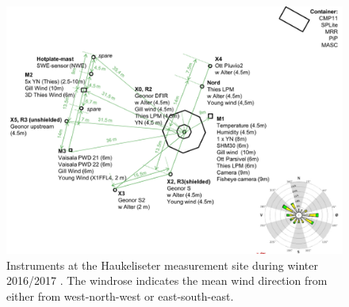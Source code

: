 \begin{figure}
\centering
	\includegraphics[width=\textwidth]{./fig_instruments/instrument_setting.png}
	\caption{Instruments at the Haukeliseter measurement site during winter 2016/2017 \citep[adapdet from][]{wolff_derivation_2015}. The windrose indicates the mean wind direction from either from west-north-west or east-south-east.}\label{fig:inst_setting}
\end{figure}
	
